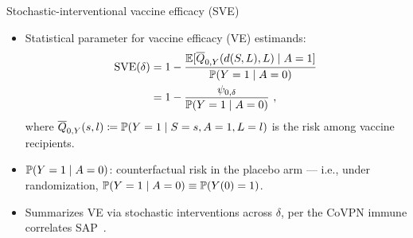 \documentclass{beamer}
\begin{document}
\begin{frame}[c]{Stochastic-interventional vaccine efficacy (SVE)}

\begin{center}
\begin{itemize}
  \itemsep8pt
  \item Statistical parameter for vaccine efficacy (VE) estimands:
  \begin{align*}
    \text{SVE}(\delta) &= 1 - \frac{\mathbb{E}[\overline{Q}_{0,Y}(d(S, L), L) \mid
                                    A = 1]}{\mathbb{P}(Y=1 \mid A=0)} \\
                       &= 1 - \frac{\psi_{0, \delta}}{\mathbb{P}(Y=1 \mid A=0)} \ ,
  \end{align*}
  where $\overline{Q}_{0,Y}(s, l) \coloneqq \mathbb{P}(Y = 1 \mid S = s, A = 1,
  L = l)$ is the risk among vaccine recipients.
  \item $\mathbb{P}(Y=1 \mid A=0)$: counterfactual risk in the placebo arm --- i.e.,
     under randomization, $\mathbb{P}(Y=1 \mid A=0) \equiv \mathbb{P}(Y(0)=1)$.
  \item Summarizes VE via stochastic interventions across $\delta$, per the
    CoVPN immune correlates SAP\footnotemark~\citep{gilbert2021covpn,
    gilbert2021immune}.
\end{itemize}
\end{center}

\note{
}


\end{frame}

\end{document}
